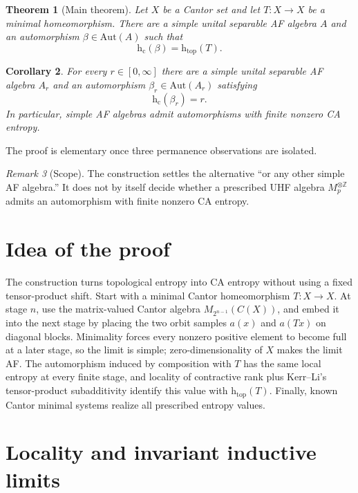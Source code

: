 \documentclass[11pt]{article}
\newtheorem{theorem}{Theorem}[section]
\newtheorem{corollary}[theorem]{Corollary}
\theoremstyle{remark}
\newtheorem{remark}[theorem]{Remark}
\newcommand{\hc}{\mathrm{h}_{\mathrm c}}
\newcommand{\htop}{\mathrm{h}_{\mathrm{top}}}
\newcommand{\Aut}{\mathrm{Aut}}
\newcommand{\Z}{\mathbb Z}
\begin{document}
\begin{theorem}[Main theorem]\label{thm:main}
Let $X$ be a Cantor set and let $T\colon X\to X$ be a minimal
homeomorphism.  There are a simple unital separable AF algebra $A$ and an
automorphism $\beta\in\Aut(A)$ such that
\[
   \hc(\beta)=\htop(T).
\]
\end{theorem}

\begin{corollary}\label{cor:all-values}
For every $r\in[0,\infty]$ there are a simple unital separable AF algebra
$A_r$ and an automorphism $\beta_r\in\Aut(A_r)$ satisfying
\[
   \hc(\beta_r)=r.
\]
In particular, simple AF algebras admit automorphisms with finite nonzero CA
entropy.
\end{corollary}

The proof is elementary once three permanence observations are isolated.

\begin{remark}[Scope]\label{rem:scope}
The construction settles the alternative ``or any other simple AF algebra.''
It does not by itself decide whether a prescribed UHF algebra
$M_p^{\otimes\Z}$ admits an automorphism with finite nonzero CA entropy.
\end{remark}

\section{Idea of the proof}

The construction turns topological entropy into CA entropy without using a
fixed tensor-product shift.  Start with a minimal Cantor homeomorphism
\(T\colon X\to X\).  At stage \(n\), use the matrix-valued Cantor algebra
\(M_{2^{n-1}}(C(X))\), and embed it into the next stage by placing the two
orbit samples \(a(x)\) and \(a(Tx)\) on diagonal blocks.  Minimality forces
every nonzero positive element to become full at a later stage, so the limit is
simple; zero-dimensionality of \(X\) makes the limit AF.  The automorphism
induced by composition with \(T\) has the same local entropy at every finite
stage, and locality of contractive rank plus Kerr--Li's tensor-product
subadditivity identify this value with \(\htop(T)\).  Finally, known Cantor
minimal systems realize all prescribed entropy values.

\section{Locality and invariant inductive limits}
\end{document}
